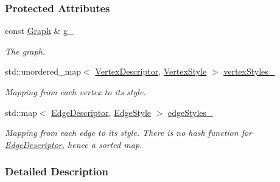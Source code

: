 \subsubsection*{Protected Attributes}
\begin{DoxyCompactItemize}
\item 
const \hyperlink{structCurrentStyles_af03ea3e1836532dbd394a7ccfdea1e4c}{Graph} \& \hyperlink{structCurrentStyles_a54f2861024a763ebdbcf9f9bcce2b9d4}{g\+\_\+}\hypertarget{structCurrentStyles_a54f2861024a763ebdbcf9f9bcce2b9d4}{}\label{structCurrentStyles_a54f2861024a763ebdbcf9f9bcce2b9d4}

\begin{DoxyCompactList}\small\item\em The graph. \end{DoxyCompactList}\item 
std\+::unordered\+\_\+map$<$ \hyperlink{structCurrentStyles_a64e3b180d16f14caf4110487114c4b8e}{Vertex\+Descriptor}, \hyperlink{structVertexStyle}{Vertex\+Style} $>$ \hyperlink{structCurrentStyles_ae3d801dc4ee6ae4e81d0bd474cbe1119}{vertex\+Styles\+\_\+}\hypertarget{structCurrentStyles_ae3d801dc4ee6ae4e81d0bd474cbe1119}{}\label{structCurrentStyles_ae3d801dc4ee6ae4e81d0bd474cbe1119}

\begin{DoxyCompactList}\small\item\em Mapping from each vertex to its style. \end{DoxyCompactList}\item 
std\+::map$<$ \hyperlink{structCurrentStyles_a95e023cdab7305f1870fde9411602cf5}{Edge\+Descriptor}, \hyperlink{structEdgeStyle}{Edge\+Style} $>$ \hyperlink{structCurrentStyles_a8e61731a0973358352d5fb8d6f219140}{edge\+Styles\+\_\+}\hypertarget{structCurrentStyles_a8e61731a0973358352d5fb8d6f219140}{}\label{structCurrentStyles_a8e61731a0973358352d5fb8d6f219140}

\begin{DoxyCompactList}\small\item\em Mapping from each edge to its style. There is no hash function for \hyperlink{structCurrentStyles_a95e023cdab7305f1870fde9411602cf5}{Edge\+Descriptor}, hence a sorted map. \end{DoxyCompactList}\end{DoxyCompactItemize}


\subsubsection{Detailed Description}
